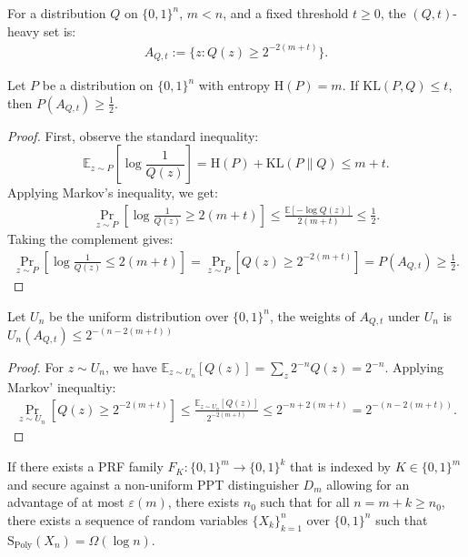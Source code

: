 \documentclass[twoside]{article}
\newcommand{\E}{\mathbb{E}}
\newcommand{\rH}{\mathrm{H}}
\begin{document}
\begin{definition}
\label{def:heavyset}
    For a distribution $Q$ on $\{0,1\}^n$, $m < n$, and a fixed threshold $t \geq 0$, the $(Q,t)$-heavy set is:
    \begin{align}
        A_{Q,t} := \{z: Q(z) \geq 2^{-2(m+t)}\}.
    \end{align}
\end{definition}
\begin{lemma}
\label{lemma:heavyset1}
    Let $P$ be a distribution on $\{0,1\}^n$ with entropy $\rH(P)=m$. If $\mathrm{KL}(P, Q) \leq t$, then $P(A_{Q,t}) \geq \frac{1}{2}$.
\end{lemma}
\begin{proof}
    First, observe the standard inequality:
    $$\E_{z\sim P}\left[\log\frac{1}{Q(z)} \right] = \rH(P) + \mathrm{KL}(P\|Q) \leq m + t.$$
    Applying Markov's inequality, we get:
    \begin{align}
        \Pr_{z\sim P}\left[\log\frac{1}{Q(z)} \geq 2(m+t)\right] \leq \frac{\E[-\log Q(z)]}{2(m+t)} \leq \frac{1}{2}.
    \end{align}
    Taking the complement gives:
    \begin{align}
        \Pr_{z\sim P}\left[\log\frac{1}{Q(z)} \leq 2(m+t)\right] = \Pr_{z\sim P}\left[Q(z) \geq 2^{-2(m+t)}\right] = P(A_{Q,t}) \geq  \frac{1}{2}.
    \end{align}
\end{proof}
\begin{lemma}
\label{lemma:heavyset2}
    Let $U_n$ be the uniform distribution over $\{0,1\}^n$, the weights of $A_{Q,t}$ under $U_n$ is $U_n(A_{Q,t}) \leq 2^{-(n-2(m+t))}$
\end{lemma}
\begin{proof}
For $z \sim U_n$, we have $\E_{z \sim U_n}[Q(z)] = \sum_{z} 2^{-n} Q(z) = 2^{-n}$. Applying Markov' inequaltiy:
\begin{align}
    \Pr_{z\sim U_n}\left[Q(z) \geq 2^{-2(m+t)}\right] \leq \frac{\E_{z \sim U_n}[Q(z)]}{2^{-2(m+t)}} \leq 2^{-n + 2(m+t)} = 2^{-(n-2(m+t))}.
\end{align}
\end{proof}

\begin{theorem}
    If there exists a PRF family $F_K: \{0,1\}^m \rightarrow \{0,1\}^k$ that is indexed by $K \in \{0,1\}^m$ and secure against a non-uniform PPT distinguisher $D_m$ allowing for an advantage of at most $\varepsilon(m)$, there exists $n_0$ such that for all $n = m+k \geq n_0$, there exists a sequence of random variables $\{X_k\}_{k=1}^n$ over $\{0,1\}^n$ such that $\mathrm{S}_{\mathrm{Poly}}(X_n) = \Omega(\log n)$.
\end{theorem}
\end{document}
